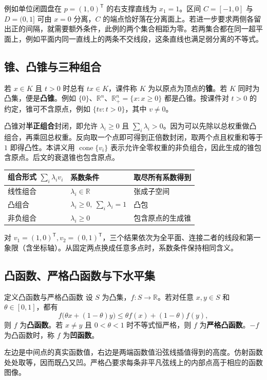 \documentclass[UTF8,fontset=none,zihao=-4,a4paper]{ctexart}
\newcommand{\term}[1]{\textbf{#1}}
\newcommand{\R}{\mathbb{R}}
\newcommand{\transpose}{^{\mathsf T}}
\newcommand{\cone}{\operatorname{cone}}
\begin{document}
例如单位闭圆盘在 $p=(1,0)\transpose$ 的右支撑直线为 $x_1=1$。区间 $C=[-1,0]$ 与 $D=(0,1]$ 可由 $x=0$ 分离，$C$ 的端点恰好落在分离面上。若进一步要求两侧各留出正的间隔，就需要额外条件，此例的两个集合相距为零。若两集合都在同一超平面上，例如平面内同一直线上的两条不交线段，这条直线也满足弱分离的不等式。

\subsection{锥、凸锥与三种组合}
若 $x\in K$ 且 $t>0$ 时总有 $tx\in K$，课件称 $K$ 为以原点为顶点的\term{锥}。若 $K$ 同时为凸集，便是\term{凸锥}。例如 $\{0\}$、$\R^n$、$\R^n_+=\{x:x\ge0\}$ 都是凸锥。按课件对 $t>0$ 的约定，锥可不含原点，例如 $\{t v:t>0\}$，其中 $v\ne0$。

凸锥对\term{半正组合}封闭，即允许 $\lambda_i\ge0$ 且 $\sum_i\lambda_i>0$。因为可以先除以总权重做凸组合，再乘回总权重。反向取一个点即可得到正倍数封闭，取两个点且权重和等于 $1$ 即得凸性。本讲义用 $\cone\{v_i\}$ 表示允许全零权重的非负组合，因此生成的锥包含原点。后文的衰退锥也包含原点。

\begin{center}
\begin{tabularx}{\linewidth}{l l Y}
\toprule
组合形式 $\sum_i\lambda_i v_i$ & 系数条件 & 取尽所有系数得到\\
\midrule
线性组合 & $\lambda_i\in\R$ & 张成子空间\\
凸组合 & $\lambda_i\ge0,\ \sum_i\lambda_i=1$ & 凸包\\
非负组合 & $\lambda_i\ge0$ & 包含原点的生成锥\\
\bottomrule
\end{tabularx}
\end{center}
对 $v_1=(1,0)\transpose,v_2=(0,1)\transpose$，三个结果依次为全平面、连接二者的线段和第一象限（含坐标轴）。从固定两点换成任意多点时，系数条件保持相同含义。

\subsection{凸函数、严格凸函数与下水平集}
\begin{infobox}{定义\quad 凸函数与严格凸函数}
设 $S$ 为凸集，$f:S\to\R$。若对任意 $x,y\in S$ 和 $\theta\in[0,1]$，都有
\[
 f\bigl(\theta x+(1-\theta)y\bigr)\le\theta f(x)+(1-\theta)f(y),
\]
则 $f$ 为\term{凸函数}。若 $x\ne y$ 且 $0<\theta<1$ 时不等式恒严格，则 $f$ 为\term{严格凸函数}。$-f$ 为凸函数时，称 $f$ 为\term{凹函数}。
\end{infobox}
左边是中间点的真实函数值，右边是两端函数值沿弦线插值得到的高度。仿射函数处处取等，因而既凸又凹。严格凸要求每条非平凡弦线上的内部点高于相应的函数图像。
\end{document}

